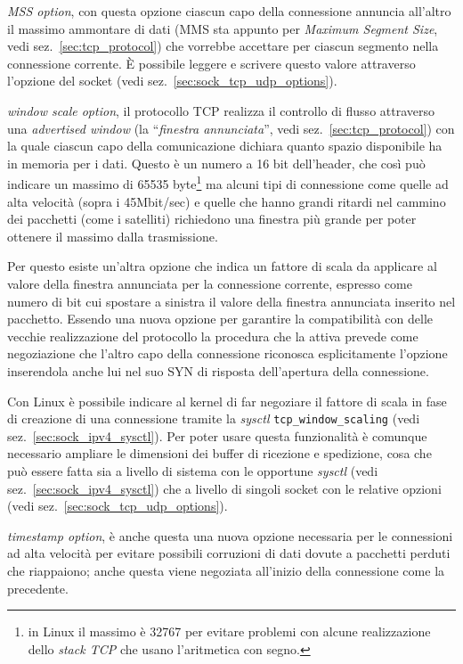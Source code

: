 \begin{itemize*}
\item \textit{MSS option}, con questa opzione ciascun capo della connessione
  annuncia all'altro il massimo ammontare di dati (MMS sta appunto per
  \textit{Maximum Segment Size}, vedi sez.~\ref{sec:tcp_protocol}) che
  vorrebbe accettare per ciascun segmento nella connessione corrente. È
  possibile leggere e scrivere questo valore attraverso l'opzione del socket
   (vedi sez.~\ref{sec:sock_tcp_udp_options}).
  
\item \textit{window scale option}, il protocollo TCP realizza il controllo di
  flusso attraverso una \textit{advertised window} (la ``\textsl{finestra
    annunciata}'', vedi sez.~\ref{sec:tcp_protocol}) con la quale ciascun capo
  della comunicazione dichiara quanto spazio disponibile ha in memoria per i
  dati. Questo è un numero a 16 bit dell'header, che così può indicare un
  massimo di 65535 byte\footnote{in Linux il massimo è 32767 per evitare
    problemi con alcune realizzazione dello \textit{stack TCP} che usano
    l'aritmetica con segno.} ma alcuni tipi di connessione come quelle ad alta
  velocità (sopra i 45Mbit/sec) e quelle che hanno grandi ritardi nel cammino
  dei pacchetti (come i satelliti) richiedono una finestra più grande per
  poter ottenere il massimo dalla trasmissione.

  Per questo esiste un'altra opzione che indica un fattore di scala da
  applicare al valore della finestra annunciata per la connessione corrente, 
  espresso come numero di bit cui spostare a sinistra il valore della
  finestra annunciata inserito nel pacchetto. Essendo una nuova opzione per
  garantire la compatibilità con delle vecchie realizzazione del protocollo la
  procedura che la attiva prevede come negoziazione che l'altro capo della
  connessione riconosca esplicitamente l'opzione inserendola anche lui nel suo
  SYN di risposta dell'apertura della connessione.

  Con Linux è possibile indicare al kernel di far negoziare il fattore di
  scala in fase di creazione di una connessione tramite la \textit{sysctl}
  \texttt{tcp\_window\_scaling} (vedi sez.~\ref{sec:sock_ipv4_sysctl}). Per
  poter usare questa funzionalità è comunque necessario ampliare le dimensioni
  dei buffer di ricezione e spedizione, cosa che può essere fatta sia a
  livello di sistema con le opportune \textit{sysctl} (vedi
  sez.~\ref{sec:sock_ipv4_sysctl}) che a livello di singoli socket con le
  relative opzioni (vedi sez.~\ref{sec:sock_tcp_udp_options}).

\item \textit{timestamp option}, è anche questa una nuova opzione necessaria
  per le connessioni ad alta velocità per evitare possibili corruzioni di dati
  dovute a pacchetti perduti che riappaiono; anche questa viene negoziata
  all'inizio della connessione come la precedente.
\end{itemize*}

